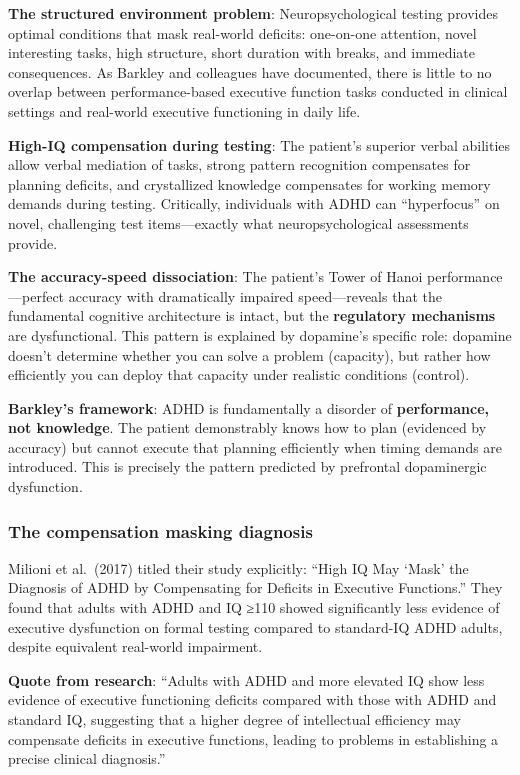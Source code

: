 \textbf{The structured environment problem}: Neuropsychological testing provides optimal conditions that mask real-world deficits: one-on-one attention, novel interesting tasks, high structure, short duration with breaks, and immediate consequences. As Barkley and colleagues have documented, there is little to no overlap between performance-based executive function tasks conducted in clinical settings and real-world executive functioning in daily life.

\textbf{High-IQ compensation during testing}: The patient's superior verbal abilities allow verbal mediation of tasks, strong pattern recognition compensates for planning deficits, and crystallized knowledge compensates for working memory demands during testing. Critically, individuals with ADHD can ``hyperfocus'' on novel, challenging test items---exactly what neuropsychological assessments provide.

\textbf{The accuracy-speed dissociation}: The patient's Tower of Hanoi performance---perfect accuracy with dramatically impaired speed---reveals that the fundamental cognitive architecture is intact, but the \textbf{regulatory mechanisms} are dysfunctional. This pattern is explained by dopamine's specific role: dopamine doesn't determine whether you can solve a problem (capacity), but rather how efficiently you can deploy that capacity under realistic conditions (control).

\textbf{Barkley's framework}: ADHD is fundamentally a disorder of \textbf{performance, not knowledge}. The patient demonstrably knows how to plan (evidenced by accuracy) but cannot execute that planning efficiently when timing demands are introduced. This is precisely the pattern predicted by prefrontal dopaminergic dysfunction.

\subsubsection{The compensation masking diagnosis}\label{10a_trd_basis-the-compensation-masking-diagnosis}

Milioni et al.~(2017) titled their study explicitly: ``High IQ May `Mask' the Diagnosis of ADHD by Compensating for Deficits in Executive Functions.'' They found that adults with ADHD and IQ ≥110 showed significantly less evidence of executive dysfunction on formal testing compared to standard-IQ ADHD adults, despite equivalent real-world impairment.

\textbf{Quote from research}: ``Adults with ADHD and more elevated IQ show less evidence of executive functioning deficits compared with those with ADHD and standard IQ, suggesting that a higher degree of intellectual efficiency may compensate deficits in executive functions, leading to problems in establishing a precise clinical diagnosis.''

